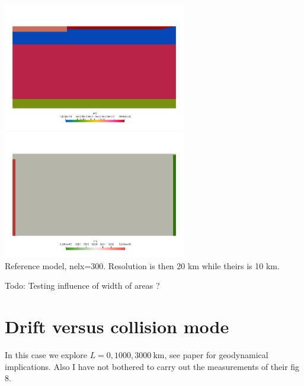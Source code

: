 \begin{center}
\includegraphics[width=8cm]{python_codes/fieldstone_143/results/resolutions/eta}
\includegraphics[width=8cm]{python_codes/fieldstone_143/results/resolutions/rho}\\
{\captionfont Reference model, nelx=300. Resolution is then 20 km while theirs is 10 km.}
\end{center}



Todo: Testing influence of width of areas ?

\newpage
\section*{Drift versus collision mode}

In this case we explore $L=0,1000,3000~\si{\km}$, see paper for geodynamical 
implications. Also I have not bothered to carry out the measurements of their fig 8.

